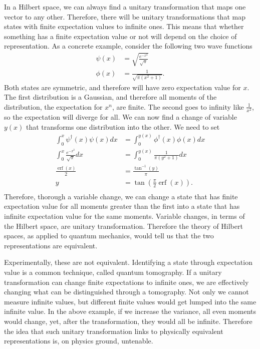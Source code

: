 \documentclass[10pt,twocolumn, nofootinbib]{revtex4-2}
\DeclareMathOperator{\erf}{erf}
\begin{document}
In a Hilbert space, we can always find a unitary transformation that maps one vector to any other. Therefore, there will be unitary transformations that map states with finite expectation values to infinite ones. This means that whether something has a finite expectation value or not will depend on the choice of representation. As a concrete example, consider the following two wave functions
\begin{align}
	\psi(x) &= \sqrt{\frac{e^{-x^2}}{\sqrt{\pi}}} \\
	\phi(x) &= \frac{1}{\sqrt{\pi(x^2 + 1)}}.
\end{align}
Both states are symmetric, and therefore will have zero expectation value for $x$. The first distribution is a Gaussian, and therefore all moments of the distribution, the expectation for $x^n$, are finite. The second goes to infinity like $\frac{1}{x^2}$, so the expectation will diverge for all. We can now find a change of variable $y(x)$ that transforms one distribution into the other. We need to set
\begin{equation}
	\begin{aligned}
	\int_{0}^{x} \psi^\dagger(x) \psi(x) dx &= \int_{0}^{y(x)} \phi^\dagger(x) \phi(x) dx \\
	\int_{0}^{x} \frac{e^{-x^2}}{\sqrt{\pi}} dx &= \int_{0}^{y(x)} \frac{1}{\pi(y^2 + 1)} dx \\
	\frac{\erf(x)}{2} &= \frac{\tan^{-1}(y)}{\pi} \\
	y &= \tan \left(\frac{\pi}{2}\erf(x)\right). \\
	\end{aligned}
\end{equation}
Therefore, thorough a variable change, we can change a state that has finite expectation value for all moments greater than the first into a state that has infinite expectation value for the same moments. Variable changes, in terms of the Hilbert space, are unitary transformation. Therefore the theory of Hilbert spaces, as applied to quantum mechanics, would tell us that the two representations are equivalent.

Experimentally, these are not equivalent. Identifying a state through expectation value is a common technique, called quantum tomography. If a unitary transformation can change finite expectations to infinite ones, we are effectively changing what can be distinguished through a tomography. Not only we cannot measure infinite values, but different finite values would get lumped into the same infinite value. In the above example, if we increase the variance, all even moments would change, yet, after the transformation, they would all be infinite. Therefore the idea that such unitary transformation links to physically equivalent representations is, on physics ground, untenable.
\end{document}
